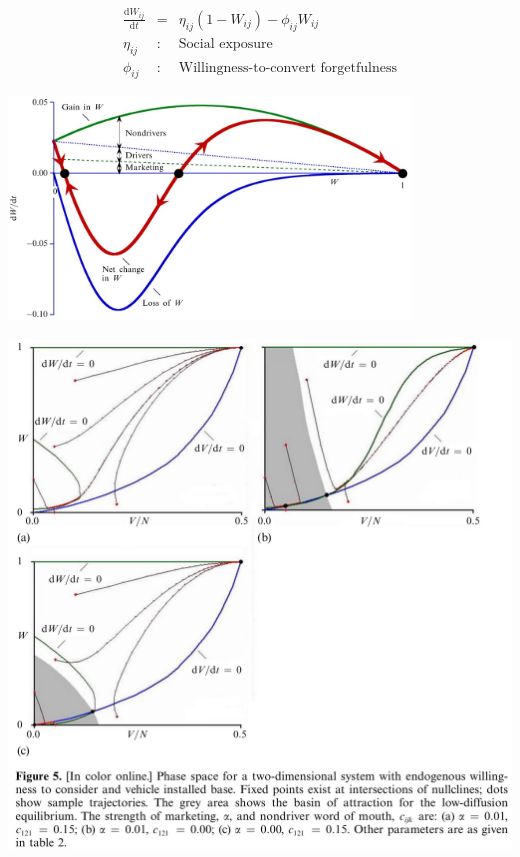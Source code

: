 \documentclass{beamer}
\begin{document}
\begin{frame}
  \begin{eqnarray*}
    \frac{\mathrm{d}W_{ij}}{\mathrm{d}t}&=&\eta_{ij}(1-W_{ij})-\phi_{ij}W_{ij}\\
    \eta_{ij}&:& \textrm{Social exposure}\\
    \phi_{ij}&:& \textrm{Willingness-to-convert forgetfulness}
  \end{eqnarray*}

  \begin{center}
    \includegraphics[width=0.8\textwidth]{Sterman-fig-4.jpg}
  \end{center}
\end{frame}
    
\begin{frame}
  \includegraphics[height=\textheight]{Sterman-fig-5.jpg}
\end{frame}
\end{document}
